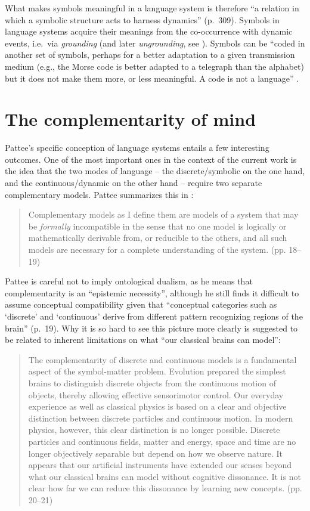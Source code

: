 What makes symbols meaningful in a language system is therefore \enquote{a relation in which a symbolic structure acts to harness dynamics} (p.~309).
Symbols in language systems acquire their meanings from the co-occurrence with dynamic events, i.e.~via \emph{grounding} (and later \emph{ungrounding}, see \citealt{Raczaszek2018language}).
Symbols can be \enquote{coded in another set of symbols, perhaps for a better adaptation to a given transmission medium (e.g., the Morse code is better adapted to a telegraph than the alphabet) but it does not make them more, or less meaningful. A code is not a language} \citep[309]{pattee2012lawssk}.

\section{The complementarity of mind}\label{sec:compofmind}

Pattee's specific conception of language systems entails a few interesting outcomes.
One of the most important ones in the context of the current work is the idea that the two modes of language -- the discrete/symbolic on the one hand, and the continuous/dynamic on the other hand -- require two separate complementary models. Pattee summarizes this in \citet[18--21]{pattee2012lawssk}:

\begin{quote}
Complementary models as I define them are models of a system that may be \emph{formally} incompatible in the sense that no one model is logically or mathematically derivable from, or reducible to the others, and all such models are necessary for a complete understanding of the system. (pp. 18–19)
\end{quote}

Pattee is careful not to imply ontological dualism, as he means that complementarity is an \enquote{epistemic necessity}, although he still finds it difficult to assume conceptual compatibility given that \enquote{conceptual categories such as \enquote{discrete} and \enquote{continuous} derive from different pattern recognizing regions of the brain} (p.~19).
Why it is so hard to see this picture more clearly is suggested to be related to inherent limitations on what \enquote{our classical brains can model}:

\begin{quote}
The complementarity of discrete and continuous models is a fundamental aspect of the symbol-matter problem. Evolution prepared the simplest brains to distinguish discrete objects from the continuous motion of objects, thereby allowing effective sensorimotor control. Our everyday experience as well as classical physics is based on a clear and objective distinction between discrete particles and continuous motion. In modern physics, however, this clear distinction is no longer possible. Discrete particles and continuous fields, matter and energy, space and time are no longer objectively separable but depend on how we observe nature. It appears that our artificial instruments have extended our senses beyond what our classical brains can model without cognitive dissonance. It is not clear how far we can reduce this dissonance by learning new concepts. (pp. 20–21)
\end{quote}

